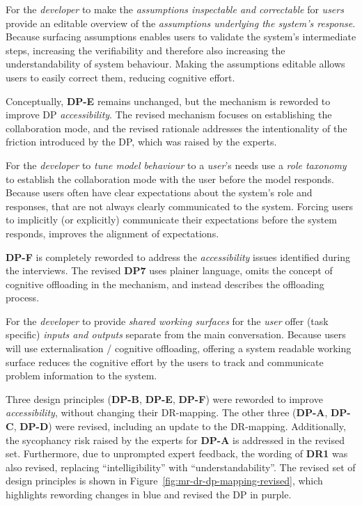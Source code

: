     {For the \textit{developer} to make the \textit{assumptions inspectable and correctable} for \textit{users}}
    {provide an editable overview of the \textit{assumptions underlying the system's response}.}
    {Because surfacing assumptions enables users to validate the system's intermediate steps, increasing the verifiability and therefore also increasing the understandability of system behaviour. Making the assumptions editable allows users to easily correct them, reducing cognitive effort.}

Conceptually, \textbf{DP-E} remains unchanged, but the mechanism is reworded to improve \ac{DP} \textit{accessibility}. The revised mechanism focuses on establishing the collaboration mode, and the revised rationale addresses the intentionality of the friction introduced by the \ac{DP}, which was raised by the experts.

    {For the \textit{developer} to \textit{tune model behaviour} to a \textit{user}'s needs}
    {use a \textit{role taxonomy} to establish the collaboration mode with the user before the model responds.}
    {Because users often have clear expectations about the system's role and responses, that are not always clearly communicated to the system. Forcing users to implicitly (or explicitly) communicate their expectations before the system responds, improves the alignment of expectations.}

\textbf{DP-F} is completely reworded to address the \textit{accessibility} issues identified during the interviews. The revised \textbf{DP7} uses plainer language, omits the concept of cognitive offloading in the mechanism, and instead describes the offloading process.

    {For the \textit{developer} to provide \textit{shared working surfaces} for the \textit{user}}
    {offer (task specific) \textit{inputs and outputs} separate from the main conversation.}
    {Because users will use externalisation / cognitive offloading, offering a system readable working surface reduces the cognitive effort by the users to track and communicate problem information to the system.}

Three design principles (\textbf{DP-B}, \textbf{DP-E}, \textbf{DP-F}) were reworded to improve \textit{accessibility}, without changing their \ac{DR}-mapping. The other three (\textbf{DP-A}, \textbf{DP-C}, \textbf{DP-D}) were revised, including an update to the \ac{DR}-mapping. Additionally, the sycophancy risk raised by the experts for \textbf{DP-A} is addressed in the revised set. Furthermore, due to unprompted expert feedback, the wording of \textbf{DR1} was also revised, replacing \enquote{intelligibility} with \enquote{understandability}. The revised set of design principles is shown in Figure~\ref{fig:mr-dr-dp-mapping-revised}, which highlights rewording changes in blue and revised the \ac{DP} in purple.

